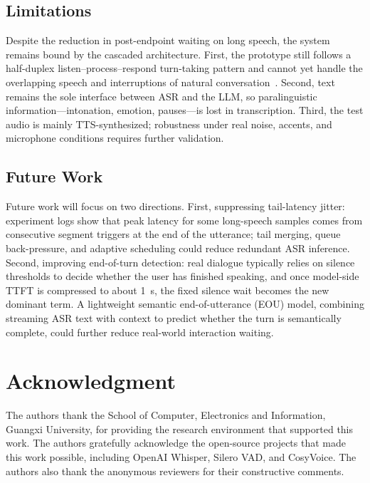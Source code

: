 \documentclass[conference]{IEEEtran}
\begin{document}
\subsection{Limitations}

Despite the reduction in post-endpoint waiting on long speech, the system remains bound by the cascaded architecture. First, the prototype still follows a half-duplex listen--process--respond turn-taking pattern and cannot yet handle the overlapping speech and interruptions of natural conversation~\cite{ref22}. Second, text remains the sole interface between ASR and the LLM, so paralinguistic information---intonation, emotion, pauses---is lost in transcription. Third, the test audio is mainly TTS-synthesized; robustness under real noise, accents, and microphone conditions requires further validation.

\subsection{Future Work}

Future work will focus on two directions. First, suppressing tail-latency jitter: experiment logs show that peak latency for some long-speech samples comes from consecutive segment triggers at the end of the utterance; tail merging, queue back-pressure, and adaptive scheduling could reduce redundant ASR inference. Second, improving end-of-turn detection: real dialogue typically relies on silence thresholds to decide whether the user has finished speaking, and once model-side TTFT is compressed to about 1~s, the fixed silence wait becomes the new dominant term. A lightweight semantic end-of-utterance (EOU) model, combining streaming ASR text with context to predict whether the turn is semantically complete, could further reduce real-world interaction waiting.

\section*{Acknowledgment}

The authors thank the School of Computer, Electronics and Information, Guangxi University, for providing the research environment that supported this work. The authors gratefully acknowledge the open-source projects that made this work possible, including OpenAI Whisper, Silero VAD, and CosyVoice. The authors also thank the anonymous reviewers for their constructive comments.



\end{document}
